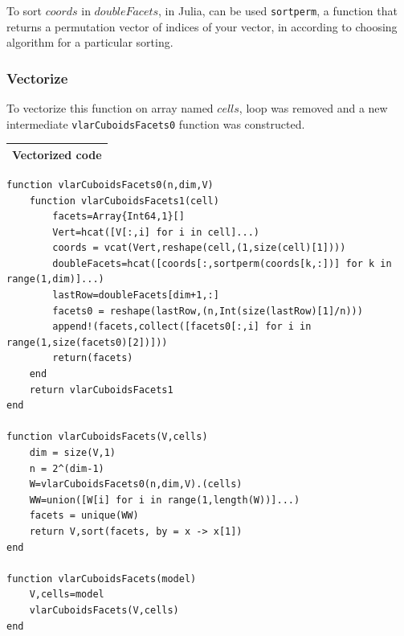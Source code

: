 \documentclass{article}
\begin{document}
To sort $coords$ in $doubleFacets$, in Julia, can be used \texttt{sortperm}, a function that returns a permutation vector of indices of your vector, in according to choosing algorithm for a particular sorting.
\vspace{2ex}

\subsubsection{Vectorize}
\vspace{1ex}
To vectorize this function on array named $cells$, loop was removed and a new intermediate \texttt{vlarCuboidsFacets0} function was constructed.
\begin{flushleft} \small
\begin{center}
\begin{tabular}{|p{16cm}|}
\hline
\cellcolor[gray]{.9}Vectorized code\\
\hline
\end{tabular}
\end{center}
\vspace{2ex}
\begin{list}{}{} \item
   \begin{Verbatim}[tabsize=4]
function vlarCuboidsFacets0(n,dim,V)
	function vlarCuboidsFacets1(cell)
		facets=Array{Int64,1}[]
		Vert=hcat([V[:,i] for i in cell]...)
		coords = vcat(Vert,reshape(cell,(1,size(cell)[1])))
		doubleFacets=hcat([coords[:,sortperm(coords[k,:])] for k in range(1,dim)]...)
		lastRow=doubleFacets[dim+1,:]
		facets0 = reshape(lastRow,(n,Int(size(lastRow)[1]/n)))
		append!(facets,collect([facets0[:,i] for i in range(1,size(facets0)[2])]))
		return(facets)
	end
	return vlarCuboidsFacets1
end

function vlarCuboidsFacets(V,cells)
	dim = size(V,1)
	n = 2^(dim-1)
	W=vlarCuboidsFacets0(n,dim,V).(cells)
	WW=union([W[i] for i in range(1,length(W))]...)
	facets = unique(WW)
	return V,sort(facets, by = x -> x[1])
end

function vlarCuboidsFacets(model)
    V,cells=model
    vlarCuboidsFacets(V,cells)
end
   \end{Verbatim}
\end{list}
\end{flushleft}

\vspace{2ex}
\end{document}

